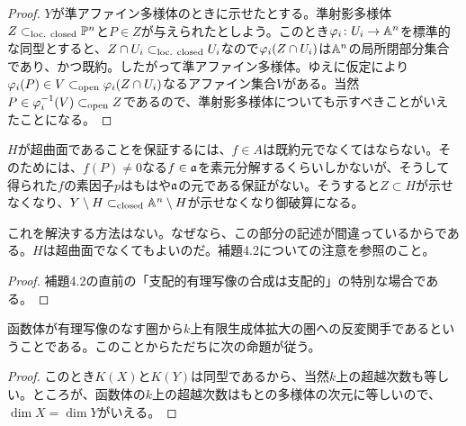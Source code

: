 \begin{proof}
  $Y$が準アファイン多様体のときに示せたとする。準射影多様体$Z \subset_{\text{loc. closed}} {\mathbb P}^n$と$P \in Z$が与えられたとしよう。このとき${\varphi}_i \colon U_i \to {\mathbb A}^n$を標準的な同型とすると、$Z \cap U_i \subset_{\text{loc. closed}} U_i$なので${\varphi}_i(Z \cap U_i)$は${\mathbb A}^n$の局所閉部分集合であり、かつ既約。したがって準アファイン多様体。ゆえに仮定により${\varphi}_i(P) \in V \subset_{\text{open}} {\varphi}_i(Z \cap U_i)$なるアファイン集合$V$がある。当然$P \in {\varphi}_i^{-1}(V) \subset_{\text{open}} Z$であるので、準射影多様体についても示すべきことがいえたことになる。
\end{proof}



\begin{rem}
  $H$が超曲面であることを保証するには、$f \in A$は既約元でなくてはならない。そのためには、$f(P) \neq 0$なる$f \in \mathfrak{a}$を素元分解するくらいしかないが、そうして得られた$f$の素因子$p$はもはや$\mathfrak{a}$の元である保証がない。そうすると$Z \subset H$が示せなくなり、$Y \setminus H \subset_{\text{closed}} {\mathbb A}^n \setminus H$が示せなくなり御破算になる。

  これを解決する方法はない。なぜなら、この部分の記述が間違っているからである。$H$は超曲面でなくてもよいのだ。補題4.2についての注意を参照のこと。
\end{rem}


\begin{proof}
  補題4.2の直前の「支配的有理写像の合成は支配的」の特別な場合である。
\end{proof}


\begin{rem}
  函数体が有理写像のなす圏から$k$上有限生成体拡大の圏への反変関手であるということである。このことからただちに次の命題が従う。
\end{rem}
\begin{proof}
このとき$K(X)$と$K(Y)$は同型であるから、当然$k$上の超越次数も等しい。ところが、函数体の$k$上の超越次数はもとの多様体の次元に等しいので、$\dim X = \dim Y$がいえる。
\end{proof}


